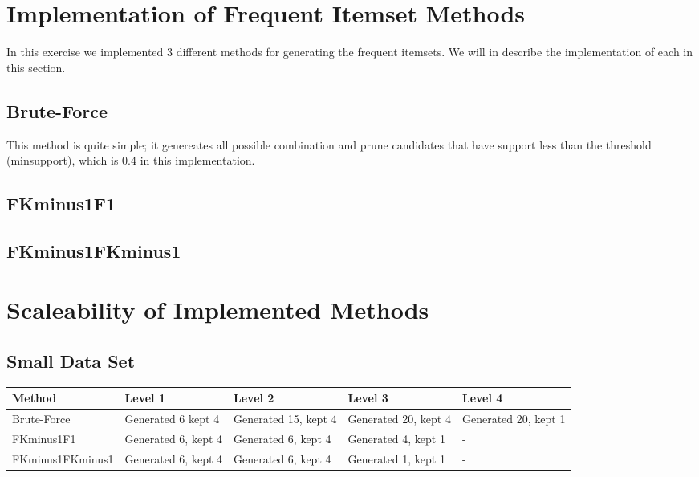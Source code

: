 \section{Implementation of Frequent Itemset Methods}
	
	In this exercise we implemented 3 different methods for generating the frequent 
	itemsets. We will in describe the implementation of each in this section.

	\subsection{Brute-Force}
		This method is quite simple; it genereates all possible combination and 
		prune candidates that have support less than the threshold (minsupport), which
		is 0.4 in this implementation. 

	\subsection{FKminus1F1}

	\subsection{FKminus1FKminus1}


\section{Scaleability of Implemented Methods}
	
	\subsection{Small Data Set}
	\begin{table}[H]
		\begin{tabular}{| p{3.5cm} | p{2.5cm} | p{2.5cm} | p{2.5cm} | p{2.5cm} | }
			\hline
			Method & Level 1 & Level 2 & Level 3 & Level 4 \\ \hline
			Brute-Force & Generated 6 kept 4 & Generated 15, kept 4 & Generated 20, kept 4 & Generated 20, kept 1 \\ \hline
			FKminus1F1 & Generated 6, kept 4 & Generated 6, kept 4 & Generated 4, kept 1 & - \\ \hline
			FKminus1FKminus1 & Generated 6, kept 4 & Generated 6, kept 4 & Generated 1, kept 1 & - \\ \hline
		\end{tabular}
	\end{table}

